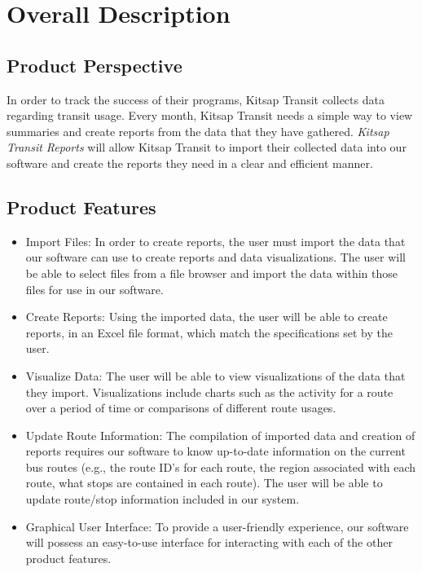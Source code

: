 \section{Overall Description}
%

\subsection{Product Perspective}
In order to track the success of their programs, Kitsap Transit collects data regarding transit usage. Every month, Kitsap Transit needs a simple way to view summaries and create reports from the data that they have gathered. \textit{Kitsap Transit Reports} will allow Kitsap Transit to import their collected data into our software and create the reports they need in a clear and efficient manner.
\subsection{Product Features}
\begin{itemize}
	\item Import Files: In order to create reports, the user must import the data that our software can use to create reports and data visualizations. The user will be able to select files from a file browser and import the data within those files for use in our software.
	\item Create Reports: Using the imported data, the user will be able to create reports, in an Excel file format, which match the specifications set by the user. 
	\item Visualize Data: The user will be able to view visualizations of the data that they import. Visualizations include charts such as the activity for a route over a period of time or comparisons of different route usages.
	\item Update Route Information: The compilation of imported data and creation of reports requires our software to know up-to-date information on the current bus routes (e.g., the route ID's for each route, the region associated with each route, what stops are contained in each route). The user will be able to update route/stop information included in our system. 
	\item Graphical User Interface: To provide a user-friendly experience, our software will possess an easy-to-use interface for interacting with each of the other product features.
\end{itemize}

